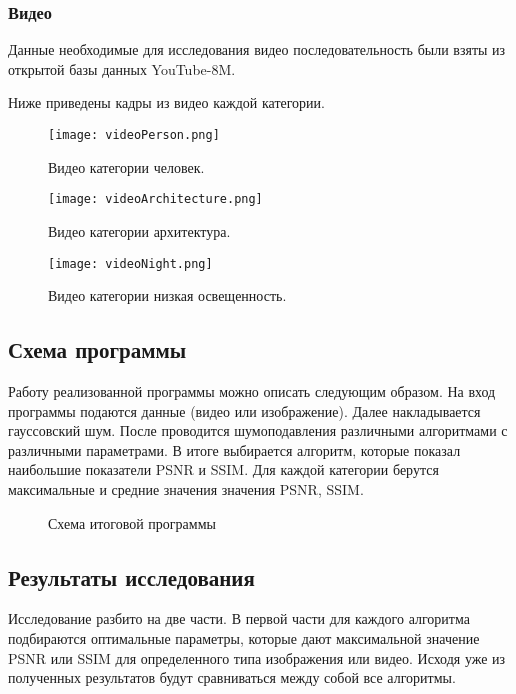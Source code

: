 \subsubsection{Видео}
Данные необходимые для исследования видео последовательность были взяты из открытой базы данных  YouTube-8M.


Ниже приведены кадры из видео каждой категории.
\begin{figure}[H]
	\begin{center}
		\begin{minipage}[h]{0.5\linewidth}
			\texttt{[image: videoPerson.png]}
			\caption{Видео категории человек.} %
			\label{img:imPerson} %
		\end{minipage}
		\hfill 
		\begin{minipage}[h]{0.5\linewidth}
			\texttt{[image: videoArchitecture.png]}
			\caption{Видео категории архитектура.}
			\label{img:imArchitecture}
		\end{minipage}
		\hfill 
		\begin{minipage}[h]{0.5\linewidth}
			\texttt{[image: videoNight.png]}
			\caption{Видео категории низкая освещенность.}
			\label{ris:experimcoded}
		\end{minipage}
	\end{center}
\end{figure}
\subsection{Схема программы}
Работу реализованной программы можно описать следующим образом. На вход программы подаются данные (видео или изображение). Далее накладывается гауссовский шум. После проводится шумоподавления различными алгоритмами с различными параметрами. В итоге выбирается алгоритм, которые показал наибольшие показатели PSNR и SSIM. Для каждой категории берутся максимальные и средние значения значения PSNR, SSIM.
\begin{figure}[H]
	\caption{Схема итоговой программы}
\end{figure}
\subsection{Результаты исследования}
Исследование разбито на две части. В первой части для каждого алгоритма подбираются оптимальные параметры, которые дают максимальной значение PSNR или SSIM для определенного типа изображения или видео. Исходя уже из полученных результатов будут сравниваться между собой все алгоритмы.

